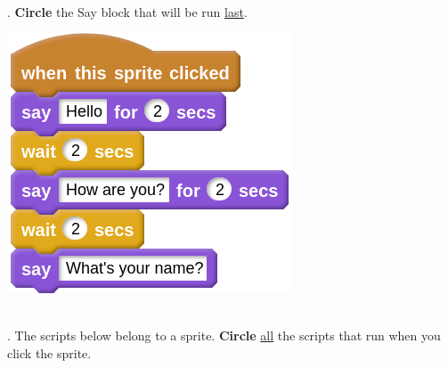 \documentclass[letterpaper,12pt]{article}
\begin{document}
\noindent \dotfill \\

. \textbf{Circle} the Say block that will be run \underline{last}.  \\
\begin{center}
\includegraphics[scale=.7]{q2_script0.png}
\end{center}

\noindent \dotfill \\

. The scripts below belong to a sprite. \textbf{Circle} \underline{all} the scripts that run when you click the sprite. \\
\end{document}
